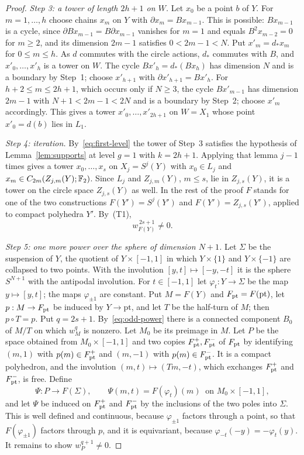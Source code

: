 \begin{proof}
\emph{Step 3: a tower of length $2h+1$ on $W$.} Let $x_0$ be a point $b$ of $Y$. For $m=1,\ldots,h$ choose chains $x_m$ on $Y$ with $\partial x_m=Bx_{m-1}$. This is possible: $Bx_{m-1}$ is a cycle, since $\partial Bx_{m-1}=B\partial x_{m-1}$ vanishes for $m=1$ and equals $B^2x_{m-2}=0$ for $m\ge2$, and its dimension $2m-1$ satisfies $0<2m-1<N$. Put $x'_m=d_*x_m$ for $0\le m\le h$. As $d$ commutes with the circle actions, $d_*$ commutes with $B$, and $x'_0,\ldots,x'_h$ is a tower on $W$. The cycle $Bx'_h=d_*(Bx_h)$ has dimension $N$ and is a boundary by Step~1; choose $x'_{h+1}$ with $\partial x'_{h+1}=Bx'_h$. For $h+2\le m\le2h+1$, which occurs only if $N\ge3$, the cycle $Bx'_{m-1}$ has dimension $2m-1$ with $N+1<2m-1<2N$ and is a boundary by Step~2; choose $x'_m$ accordingly. This gives a tower $x'_0,\ldots,x'_{2h+1}$ on $W=X_1$ whose point $x'_0=d(b)$ lies in $L_1$.

\emph{Step 4: iteration.} By~\eqref{eq:first-level} the tower of Step~3 satisfies the hypothesis of Lemma~\ref{lem:supports} at level $g=1$ with $k=2h+1$. Applying that lemma $j-1$ times gives a tower $x_0,\ldots,x_s$ on $X_j=S^j(Y)$ with $x_0\in L_j$ and $x_m\in C_{2m}(Z_{j,m}(Y);\mathbb F_2)$. Since $L_j$ and $Z_{j,m}(Y)$, $m\le s$, lie in $Z_{j,s}(Y)$, it is a tower on the circle space $Z_{j,s}(Y)$ as well. In the rest of the proof $F$ stands for one of the two constructions $F(Y')=S^j(Y')$ and $F(Y')=Z_{j,s}(Y')$, applied to compact polyhedra $Y'$. By~(T1),
\begin{equation}\label{eq:odd-power}
 w_{F(Y)}^{\,2s+1}\ne0 .
\end{equation}

\emph{Step 5: one more power over the sphere of dimension $N+1$.} Let $\Sigma$ be the suspension of $Y$, the quotient of $Y\times[-1,1]$ in which $Y\times\{1\}$ and $Y\times\{-1\}$ are collapsed to two points. With the involution $[y,t]\mapsto[-y,-t]$ it is the sphere $S^{N+1}$ with the antipodal involution. For $t\in[-1,1]$ let $\varphi_t:Y\to\Sigma$ be the map $y\mapsto[y,t]$; the maps $\varphi_{\pm1}$ are constant. Put $M=F(Y)$ and $F_{\rm pt}=F(\mathrm{pt})$, let $p:M\to F_{\rm pt}$ be induced by $Y\to\mathrm{pt}$, and let $T$ be the half-turn of $M$; then $p\circ T=p$. Put $q=2s+1$. By~\eqref{eq:odd-power} there is a connected component $B_0$ of $M/T$ on which $w_M^q$ is nonzero. Let $M_0$ be its preimage in $M$. Let $P$ be the space obtained from $M_0\times[-1,1]$ and two copies $F_{\rm pt}^+,F_{\rm pt}^-$ of $F_{\rm pt}$ by identifying $(m,1)$ with $p(m)\in F_{\rm pt}^+$ and $(m,-1)$ with $p(m)\in F_{\rm pt}^-$. It is a compact polyhedron, and the involution $(m,t)\mapsto(Tm,-t)$, which exchanges $F_{\rm pt}^+$ and $F_{\rm pt}^-$, is free. Define
\[
 \Psi:P\to F(\Sigma),\qquad\Psi(m,t)=F(\varphi_t)(m)\ \text{ on }M_0\times[-1,1],
\]
and let $\Psi$ be induced on $F_{\rm pt}^+$ and $F_{\rm pt}^-$ by the inclusions of the two poles into $\Sigma$. This is well defined and continuous, because $\varphi_{\pm1}$ factors through a point, so that $F(\varphi_{\pm1})$ factors through $p$, and it is equivariant, because $\varphi_{-t}(-y)=-\varphi_t(y)$. It remains to show $w_P^{q+1}\ne0$.


\end{proof}
